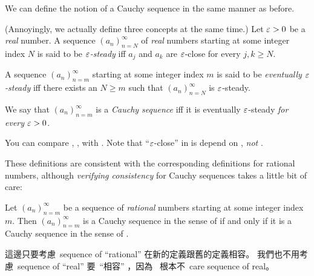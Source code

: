 We can define the notion of a Cauchy sequence in the same manner as before.

\begin{definition}  \label{def 6.1.3}
(Annoyingly, we actually define three concepts at the same time.)
Let \(\varepsilon > 0\) be a \emph{real} number.
 A sequence \((a_n)_{n = N}^{\infty}\) of \emph{real} numbers starting at some integer index \(N\) is said to be \emph{\(\varepsilon\)-steady} iff \(a_j\) and \(a_k\) are \(\varepsilon\)-close for every \(j, k \ge N\).

 A sequence \((a_n)_{n = m}^{\infty}\) starting at some integer index \(m\) is said to be \emph{eventually \(\varepsilon\)-steady} iff there exists an \(N \ge m\) such that \((a_n)_{n = N}^{\infty}\) is \(\varepsilon\)-steady.

 We say that \((a_n)_{n = m}^{\infty}\) is a \emph{Cauchy sequence} iff it is eventually \(\varepsilon\)-steady \emph{for every} \(\varepsilon > 0\).
\end{definition}

\begin{note}
You can compare , ,  with .
Note that ``\(\varepsilon\)-close'' in  is depend on , \emph{not} .

These definitions are consistent with the corresponding definitions for rational numbers, although \emph{verifying consistency} for Cauchy sequences takes a little bit of care:
\end{note}

\begin{proposition} \label{prop 6.1.4}
Let \((a_n)_{n = m}^{\infty}\) be a sequence of \emph{rational} numbers starting at some integer index \(m\).
Then \((a_n)_{n = m}^{\infty}\) is a Cauchy sequence in the sense of  if and only if it is a Cauchy sequence in the sense of .
\end{proposition}

\begin{note}
這邊只要考慮\ sequence of ``rational'' 在新的定義跟舊的定義相容。 我們也不用考慮\ sequence of ``real'' 要\ ``相容'' ，因為\  根本不\ care sequence of real。
\end{note}

